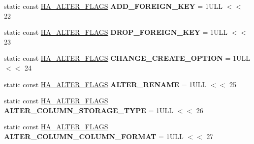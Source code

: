 \begin{DoxyCompactItemize}
\item 
\mbox{\label{classAlter__inplace__info_a1a654558af50d19d603eb5d66dddaf9f}} 
static const \mbox{\hyperlink{classAlter__inplace__info_a45258f36b4942b5cabee7239463daaca}{H\+A\+\_\+\+A\+L\+T\+E\+R\+\_\+\+F\+L\+A\+GS}} {\bfseries A\+D\+D\+\_\+\+F\+O\+R\+E\+I\+G\+N\+\_\+\+K\+EY} = 1\+U\+L\+L $<$$<$ 22
\item 
\mbox{\label{classAlter__inplace__info_a88fe61a62890270a02926af32cbad9f8}} 
static const \mbox{\hyperlink{classAlter__inplace__info_a45258f36b4942b5cabee7239463daaca}{H\+A\+\_\+\+A\+L\+T\+E\+R\+\_\+\+F\+L\+A\+GS}} {\bfseries D\+R\+O\+P\+\_\+\+F\+O\+R\+E\+I\+G\+N\+\_\+\+K\+EY} = 1\+U\+L\+L $<$$<$ 23
\item 
\mbox{\label{classAlter__inplace__info_addf4222a3de67be18b129433aceca71a}} 
static const \mbox{\hyperlink{classAlter__inplace__info_a45258f36b4942b5cabee7239463daaca}{H\+A\+\_\+\+A\+L\+T\+E\+R\+\_\+\+F\+L\+A\+GS}} {\bfseries C\+H\+A\+N\+G\+E\+\_\+\+C\+R\+E\+A\+T\+E\+\_\+\+O\+P\+T\+I\+ON} = 1\+U\+L\+L $<$$<$ 24
\item 
\mbox{\label{classAlter__inplace__info_a7bef8a7c2a8f630a2a06b69a9062954f}} 
static const \mbox{\hyperlink{classAlter__inplace__info_a45258f36b4942b5cabee7239463daaca}{H\+A\+\_\+\+A\+L\+T\+E\+R\+\_\+\+F\+L\+A\+GS}} {\bfseries A\+L\+T\+E\+R\+\_\+\+R\+E\+N\+A\+ME} = 1\+U\+L\+L $<$$<$ 25
\item 
\mbox{\label{classAlter__inplace__info_a4d2a49245eeb261c2fdb3a2c5e51ab42}} 
static const \mbox{\hyperlink{classAlter__inplace__info_a45258f36b4942b5cabee7239463daaca}{H\+A\+\_\+\+A\+L\+T\+E\+R\+\_\+\+F\+L\+A\+GS}} {\bfseries A\+L\+T\+E\+R\+\_\+\+C\+O\+L\+U\+M\+N\+\_\+\+S\+T\+O\+R\+A\+G\+E\+\_\+\+T\+Y\+PE} = 1\+U\+L\+L $<$$<$ 26
\item 
\mbox{\label{classAlter__inplace__info_a58e881499776ebe1f209d5f554e8d248}} 
static const \mbox{\hyperlink{classAlter__inplace__info_a45258f36b4942b5cabee7239463daaca}{H\+A\+\_\+\+A\+L\+T\+E\+R\+\_\+\+F\+L\+A\+GS}} {\bfseries A\+L\+T\+E\+R\+\_\+\+C\+O\+L\+U\+M\+N\+\_\+\+C\+O\+L\+U\+M\+N\+\_\+\+F\+O\+R\+M\+AT} = 1\+U\+L\+L $<$$<$ 27
\item 

\end{DoxyCompactItemize}
